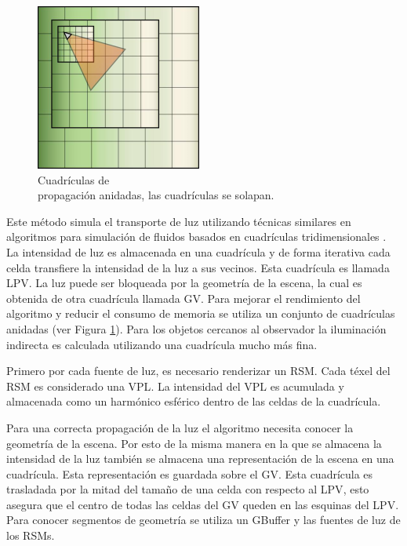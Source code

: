 \begin{figure}
	\centering
	\includegraphics[width=0.90\linewidth]{media/g4957.png}
	\caption{Cuadrículas de \\ propagación anidadas, las cuadrículas se solapan.}
	\label{fig:nested_lpv}
\end{figure}
\noindent Este método simula el transporte de luz utilizando técnicas similares en algoritmos para simulación de fluidos basados en cuadrículas tridimensionales \cite{Crane07}. La intensidad de luz es almacenada en una cuadrícula y de forma iterativa cada celda transfiere la intensidad de la luz a sus vecinos. Esta cuadrícula es llamada \ac{LPV}. La luz puede ser bloqueada por la geometría de la escena, la cual es obtenida de otra cuadrícula llamada \ac{GV}. Para mejorar el rendimiento del algoritmo y reducir el consumo de memoria se utiliza un conjunto de cuadrículas anidadas (ver Figura \ref{fig:nested_lpv}). Para los objetos cercanos al observador la iluminación indirecta es calculada utilizando una cuadrícula mucho más fina.

Primero por cada fuente de luz, es necesario renderizar un \ac{RSM}. Cada téxel del \ac{RSM} es considerado una \ac{VPL}. La intensidad del \ac{VPL} es acumulada y almacenada como un harmónico esférico dentro de las celdas de la cuadrícula.

Para una correcta propagación de la luz el algoritmo necesita conocer la geometría de la escena. Por esto de la misma manera en la que se almacena la intensidad de la luz también se almacena una representación de la escena en una cuadrícula. Esta representación es guardada sobre el \ac{GV}. Esta cuadrícula es trasladada por la mitad del tamaño de una celda con respecto al \ac{LPV}, esto asegura que el centro de todas las celdas del \ac{GV} queden en las esquinas del \ac{LPV}. Para conocer segmentos de geometría se utiliza un \ac{GBuffer} y las fuentes de luz de los \ac{RSM}s.


